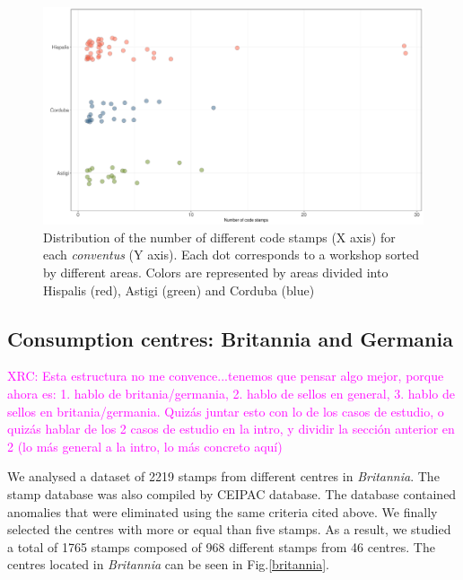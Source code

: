 \documentclass[review]{elsarticle}
\newcommand{\memo}[2]{\textcolor{#1}{#2}}
\newcommand{\xavi}[1]{\memo{magenta}{XRC: #1\\}}
\begin{document}
\begin{figure}[htp]
	\centering
\includegraphics[width=\linewidth]{figs/frequency}
\caption{Distribution of the number of different code stamps (X axis) for each \textit{conventus} (Y axis). Each dot corresponds to a workshop sorted by different areas. Colors are represented by areas divided into Hispalis (red), Astigi (green) and Corduba (blue)}
\label{frequency}
\end{figure} 



\subsection{Consumption centres: Britannia and Germania}

\xavi{Esta estructura no me convence...tenemos que pensar algo mejor, porque ahora es: 1. hablo de britania/germania, 2. hablo de sellos en general, 3. hablo de sellos en britania/germania. Quizás juntar esto con lo de los casos de estudio, o quizás hablar de los 2 casos de estudio en la intro, y dividir la sección anterior en 2 (lo más general a la intro, lo más concreto aquí)}

We analysed a dataset of 2219 stamps from different centres in \textit{Britannia}. 
The stamp database was also compiled by CEIPAC database. The database contained anomalies that were eliminated using the same criteria cited above. We finally selected the centres with more or equal than five stamps. As a result, we studied a total of 1765 stamps composed of 968 different stamps from 46 centres.
The centres located in \textit{Britannia} can be seen in Fig.\ref{britannia}.
 
\end{document}
